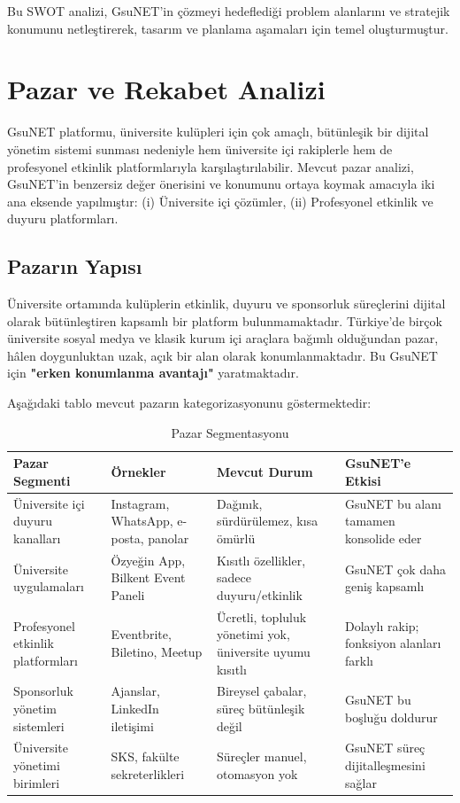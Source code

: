 \documentclass[a4paper,12pt]{report}
\begin{document}
Bu SWOT analizi, GsuNET'in çözmeyi hedeflediği problem alanlarını ve stratejik konumunu netleştirerek, tasarım ve planlama aşamaları için temel oluşturmuştur.

\section{Pazar ve Rekabet Analizi}

GsuNET platformu, üniversite kulüpleri için çok amaçlı, bütünleşik bir dijital yönetim sistemi sunması nedeniyle hem üniversite içi rakiplerle hem de profesyonel etkinlik platformlarıyla karşılaştırılabilir. Mevcut pazar analizi, GsuNET'in benzersiz değer önerisini ve konumunu ortaya koymak amacıyla iki ana eksende yapılmıştır: (i) Üniversite içi çözümler, (ii) Profesyonel etkinlik ve duyuru platformları.

\subsection{Pazarın Yapısı}

Üniversite ortamında kulüplerin etkinlik, duyuru ve sponsorluk süreçlerini dijital olarak bütünleştiren kapsamlı bir platform bulunmamaktadır. Türkiye'de birçok üniversite sosyal medya ve klasik kurum içi araçlara bağımlı olduğundan pazar, hâlen doygunluktan uzak, açık bir alan olarak konumlanmaktadır. Bu GsuNET için \textbf{"erken konumlanma avantajı"} yaratmaktadır.

Aşağıdaki tablo mevcut pazarın kategorizasyonunu göstermektedir:

\begin{table}[h]
\centering
\small
\begin{tabular}{|p{3cm}|p{3cm}|p{4cm}|p{3.5cm}|}
\hline
\textbf{Pazar Segmenti} & \textbf{Örnekler} & \textbf{Mevcut Durum} & \textbf{GsuNET'e Etkisi} \\
\hline
Üniversite içi duyuru kanalları & Instagram, WhatsApp, e-posta, panolar & Dağınık, sürdürülemez, kısa ömürlü & GsuNET bu alanı tamamen konsolide eder \\
\hline
Üniversite uygulamaları & Özyeğin App, Bilkent Event Paneli & Kısıtlı özellikler, sadece duyuru/etkinlik & GsuNET çok daha geniş kapsamlı \\
\hline
Profesyonel etkinlik platformları & Eventbrite, Biletino, Meetup & Ücretli, topluluk yönetimi yok, üniversite uyumu kısıtlı & Dolaylı rakip; fonksiyon alanları farklı \\
\hline
Sponsorluk yönetim sistemleri & Ajanslar, LinkedIn iletişimi & Bireysel çabalar, süreç bütünleşik değil & GsuNET bu boşluğu doldurur \\
\hline
Üniversite yönetimi birimleri & SKS, fakülte sekreterlikleri & Süreçler manuel, otomasyon yok & GsuNET süreç dijitalleşmesini sağlar \\
\hline
\end{tabular}
\caption{Pazar Segmentasyonu}
\end{table}
\end{document}
